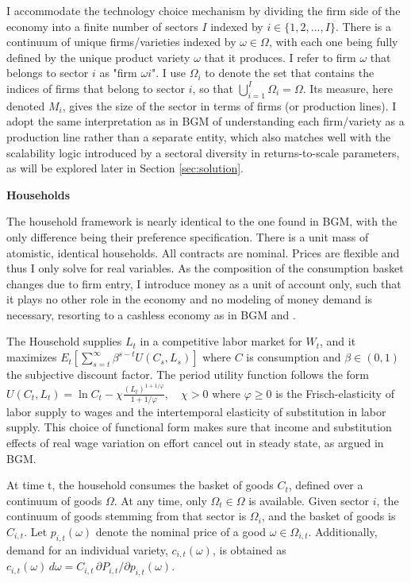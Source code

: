 \documentclass[a4paper,12pt]{article} %
\numberwithin{equation}{section} %
\numberwithin{figure}{section}
\numberwithin{table}{section}
\begin{document}
I accommodate the technology choice mechanism by dividing the firm side of the economy into a finite number of sectors $I$ indexed by
$i \in \{1,2,...,I\}$. There is a continuum of unique firms/varieties indexed by $\omega \in \Omega$, with each one being fully defined by 
the unique product variety $\omega$ that it produces. I refer to firm $\omega$ that belongs to sector $i$ as "firm $\omega i$". 
I use $\Omega_i$ to denote the set that contains the indices of firms that belong to sector $i$, so that $\bigcup_{i=1}^{I} \Omega_i = \Omega$. 
Its measure, here denoted $M_{i}$, gives the size of the sector in terms of firms (or production lines). I adopt the same interpretation as in BGM 
of understanding each firm/variety as a production line rather than a separate entity, which also matches well with the scalability logic introduced
by a sectoral diversity in returns-to-scale parameters, as will be explored later in Section \ref{sec:solution}.

\medskip
\medskip
\noindent\textbf{Households}
\medskip

The household framework is nearly identical to the one found in BGM, with the only difference being their preference specification. There is a 
unit mass of atomistic, identical households. All contracts are nominal. Prices are flexible and thus I only solve for real variables. As the
composition of the consumption basket changes due to firm entry, I introduce money as a unit of account only, such that it plays no other role in the
economy and no modeling of money demand is necessary, resorting to a cashless economy as in BGM and \textcite{woodford2003interest}.

The Household supplies $L_t$ in a competitive labor market for $W_t$, and it maximizes $E_t \left[ \sum_{s=t}^{\infty} \beta^{s - t} U(C_s, L_s) \right]$ 
where $C$ is consumption and $\beta \in (0,1)$ the subjective discount factor. The period utility function follows the form 
$U(C_t, L_t) = \ln C_t - \chi \frac{(L_t)^{1 + 1/\varphi}}{1 + 1/\varphi}, \quad \chi > 0$ where $\varphi \geq 0$ is the Frisch-elasticity
of labor supply to wages and the intertemporal elasticity of substitution in labor supply. This choice of functional form makes sure that 
income and substitution effects of real wage variation on effort cancel out in steady state, as argued in BGM.

At time t, the household consumes the basket of goods $C_t$, defined over a continuum of goods $\Omega$. At any time, only $\Omega_t \in \Omega$ 
is available. Given sector $i$, the continuum of goods stemming from that sector is $\Omega_{i}$, and the basket of goods is $C_{i,t}$. 
Let $p_{i,t}(\omega)$ denote the nominal price 
of a good $\omega \in \Omega_{i,t}$. Additionally, demand for an individual variety, $c_{i,t}(\omega)$, is obtained as 
$c_{i,t}(\omega) \, d\omega = C_{i,t} \, \partial P_{i,t} / \partial p_{i,t}(\omega)$.
\end{document}
